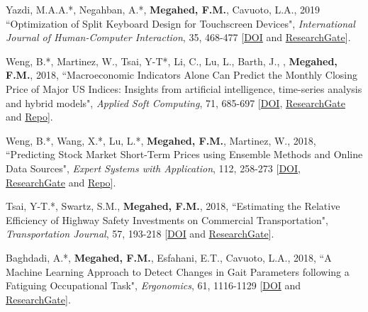 \documentclass[margin,line]{res}
\begin{document}
\begin{resume}
\vspace{-1.5mm}
Yazdi, M.A.A.*, Negahban, A.*, \textbf{Megahed, F.M.}, Cavuoto, L.A., 2019 ``Optimization of Split Keyboard Design for Touchscreen Devices", \textit{International Journal of Human-Computer Interaction}, 35, 468-477 [\faFile*\href{https://doi.org/10.1080/10447318.2018.1464255}{DOI} and \faResearchgate \href{https://www.researchgate.net/publication/324661875_Optimization_of_Split_Keyboard_Design_for_Touchscreen_Devices}{ResearchGate}].

\vspace{-1.5mm}
Weng, B.*, Martinez, W., Tsai, Y-T*, Li, C., Lu, L., Barth, J., , \textbf{Megahed, F.M.}, 2018, ``Macroeconomic Indicators Alone Can Predict the Monthly Closing Price of Major US Indices: Insights from artificial intelligence, time-series analysis and hybrid models", \textit{Applied Soft Computing}, 71, 685-697 [\faFile*\href{https://doi.org/10.1016/j.asoc.2018.07.024}{DOI}, \faResearchgate \href{https://www.researchgate.net/publication/326378870_Macroeconomic_Indicators_Alone_can_Predict_the_Monthly_Closing_Price_of_Major_US_Indices_Insights_from_Artificial_Intelligence_Time-Series_Analysis_and_Hybrid_Models}{ResearchGate} and \faGithub \href{https://github.com/martinwg/stockpredict.git}{Repo}].

\vspace{-1.5mm}
Weng, B.*, Wang, X.*, Lu, L.*, \textbf{Megahed, F.M.}, Martinez, W., 2018, ``Predicting Stock Market Short-Term Prices using Ensemble Methods and Online Data Sources", \textit{Expert Systems with Application}, 112, 258-273 [\faFile*\href{https://doi.org/10.1016/j.eswa.2018.06.016}{DOI}, \faResearchgate \href{https://www.researchgate.net/publication/325786183_Predicting_Short-Term_Stock_Prices_using_Ensemble_Methods_and_Online_Data_Sources}{ResearchGate} and \faGithub \href{https://github.com/martinwg/stockprediction}{Repo}].

\vspace{-1.5mm}
Tsai, Y-T.*, Swartz, S.M., \textbf{Megahed, F.M.}, 2018, ``Estimating the Relative Efficiency of Highway Safety Investments on Commercial Transportation", \textit{Transportation Journal}, 57, 193-218 [\faFile*\href{https://doi.org/10.5325/transportationj.57.2.0193}{DOI} and \faResearchgate \href{https://www.researchgate.net/publication/314169455_Estimating_the_Relative_Efficiency_of_Highway_Safety_Investments_on_Commercial_Transportation}{ResearchGate}].

\vspace{-1.5mm}
Baghdadi, A.*, \textbf{Megahed, F.M.}, Esfahani, E.T., Cavuoto, L.A., 2018, ``A Machine Learning Approach to Detect Changes in Gait Parameters following a Fatiguing Occupational Task", \textit{Ergonomics}, 61, 1116-1129 [\faFile*\href{https://doi.org/10.1080/00140139.2018.1442936}{DOI} and \faResearchgate \href{https://www.researchgate.net/publication/323240712_A_machine_learning_approach_to_detect_changes_in_gait_parameters_following_a_fatiguing_occupational_task}{ResearchGate}].


\end{resume}
\end{document}
